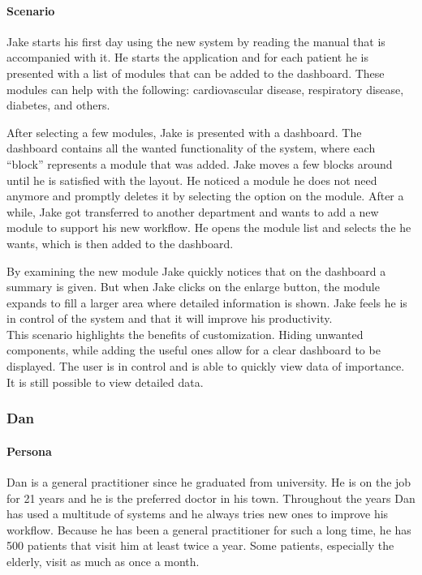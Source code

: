         \paragraph{Scenario} Jake starts his first day using the new system by reading the manual that is accompanied with it. He starts the application and for each patient he is presented with a list of modules that can be added to the dashboard. These modules can help with the following: cardiovascular disease, respiratory disease, diabetes, and others.

        After selecting a few modules, Jake is presented with a dashboard. The dashboard contains all the wanted functionality of the system, where each ``block'' represents a module that was added. Jake moves a few blocks around until he is satisfied with the layout. He noticed a module he does not need anymore and promptly deletes it by selecting the option on the module. After a while, Jake got transferred to another department and wants to add a new module to support his new workflow. He opens the module list and selects the he wants, which is then added to the dashboard.

        By examining the new module Jake quickly notices that on the dashboard a summary is given. But when Jake clicks on the enlarge button, the module expands to fill a larger area where detailed information is shown. Jake feels he is in control of the system and that it will improve his productivity.\\

        \noindent This scenario highlights the benefits of customization. Hiding unwanted components, while adding the useful ones allow for a clear dashboard to be displayed. The user is in control and is able to quickly view data of importance. It is still possible to view detailed data.
        
        \subsubsection{Dan}

        \paragraph{Persona} Dan is a general practitioner since he graduated from university. He is on the job for 21 years and he is the preferred doctor in his town. Throughout the years Dan has used a multitude of systems and he always tries new ones to improve his workflow. Because he has been a general practitioner for such a long time, he has 500 patients that visit him at least twice a year. Some patients, especially the elderly, visit as much as once a month.

